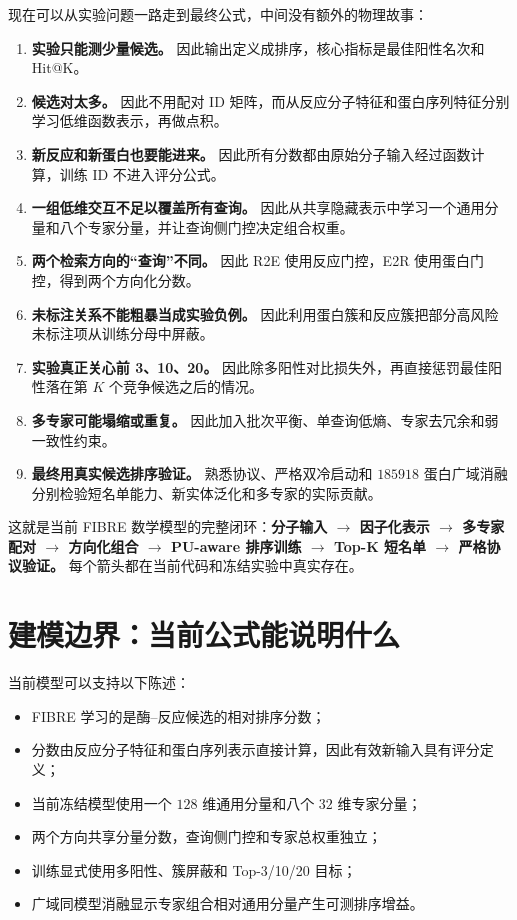 \documentclass[UTF8,11pt,a4paper]{ctexart}
\begin{document}
现在可以从实验问题一路走到最终公式，中间没有额外的物理故事：

\begin{enumerate}[label=\textbf{\arabic*.}]
\item \textbf{实验只能测少量候选。} 因此输出定义成排序，核心指标是最佳阳性名次和 Hit@K。
\item \textbf{候选对太多。} 因此不用配对 ID 矩阵，而从反应分子特征和蛋白序列特征分别学习低维函数表示，再做点积。
\item \textbf{新反应和新蛋白也要能进来。} 因此所有分数都由原始分子输入经过函数计算，训练 ID 不进入评分公式。
\item \textbf{一组低维交互不足以覆盖所有查询。} 因此从共享隐藏表示中学习一个通用分量和八个专家分量，并让查询侧门控决定组合权重。
\item \textbf{两个检索方向的“查询”不同。} 因此 R2E 使用反应门控，E2R 使用蛋白门控，得到两个方向化分数。
\item \textbf{未标注关系不能粗暴当成实验负例。} 因此利用蛋白簇和反应簇把部分高风险未标注项从训练分母中屏蔽。
\item \textbf{实验真正关心前 3、10、20。} 因此除多阳性对比损失外，再直接惩罚最佳阳性落在第 $K$ 个竞争候选之后的情况。
\item \textbf{多专家可能塌缩或重复。} 因此加入批次平衡、单查询低熵、专家去冗余和弱一致性约束。
\item \textbf{最终用真实候选排序验证。} 熟悉协议、严格双冷启动和 $185918$ 蛋白广域消融分别检验短名单能力、新实体泛化和多专家的实际贡献。
\end{enumerate}

\begin{keybox}
这就是当前 FIBRE 数学模型的完整闭环：\textbf{分子输入 $\rightarrow$ 因子化表示 $\rightarrow$ 多专家配对 $\rightarrow$ 方向化组合 $\rightarrow$ PU-aware 排序训练 $\rightarrow$ Top-K 短名单 $\rightarrow$ 严格协议验证。} 每个箭头都在当前代码和冻结实验中真实存在。
\end{keybox}

\section{建模边界：当前公式能说明什么}

当前模型可以支持以下陈述：

\begin{itemize}
\item FIBRE 学习的是酶--反应候选的相对排序分数；
\item 分数由反应分子特征和蛋白序列表示直接计算，因此有效新输入具有评分定义；
\item 当前冻结模型使用一个 $128$ 维通用分量和八个 $32$ 维专家分量；
\item 两个方向共享分量分数，查询侧门控和专家总权重独立；
\item 训练显式使用多阳性、簇屏蔽和 Top-3/10/20 目标；
\item 广域同模型消融显示专家组合相对通用分量产生可测排序增益。
\end{itemize}
\end{document}
